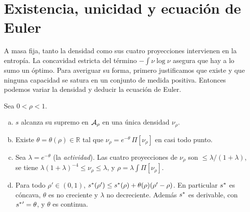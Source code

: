 \section{Existencia, unicidad y ecuación de Euler}\label{sec:euler}

A masa fija, tanto la densidad como sus cuatro proyecciones intervienen en la entropía.
La concavidad estricta del término $-\int\nu\log\nu$ asegura que hay a lo sumo un óptimo. Para averiguar su forma,
primero justificamos que existe y que ninguna capacidad se satura en un conjunto
de medida positiva. Entonces podemos variar la densidad y deducir la ecuación de Euler.

\begin{teorema}\label{thm:max}
Sea $0<\rho<1$.
\begin{enumerate}[(a)]
\item $s$ alcanza su supremo en ${\mathcal{A}}_\rho$ en una única densidad $\nu_\rho$.
\item Existe $\theta=\theta(\rho)\in\mathbb R$ tal que $\nu_\rho=e^{-\theta}\,\Pi[\nu_\rho]$ en casi todo
punto.
\item Sea $\lambda=e^{-\theta}$ (la \emph{actividad}). Las cuatro proyecciones de $\nu_\rho$ son $\le\lambda/(1+\lambda)$, se
tiene $\lambda(1+\lambda)^{-4}\le\nu_\rho\le\lambda$, y $\rho=\lambda\int\Pi[\nu_\rho]$.
\item Para todo $\rho'\in(0,1)$, $s^{*}(\rho')\le s^{*}(\rho)+\theta(\rho)(\rho'-\rho)$. En
particular $s^{*}$ es cóncava, $\theta$ es no creciente y $\lambda$ no decreciente. Además $s^{*}$ es
derivable, con $s^{*}{}'=\theta$, y $\theta$ es continua.
\end{enumerate}
\end{teorema}

